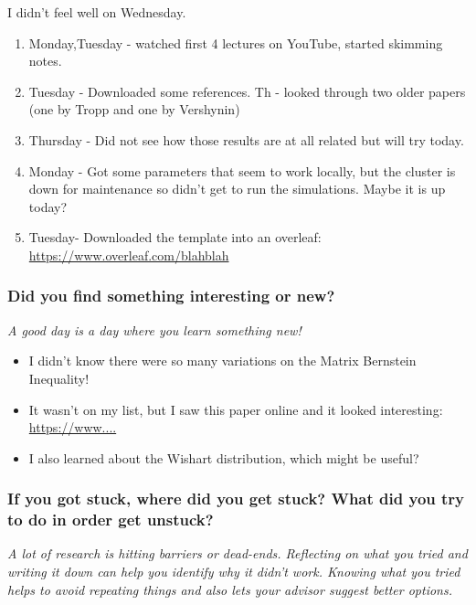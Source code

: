 \documentclass[10pt, letter]{article}
\begin{document}
\begin{note}
I didn't feel well on Wednesday.
	\begin{enumerate}
	\item Monday,Tuesday - watched first 4 lectures on YouTube, started skimming notes.
	\item Tuesday - Downloaded some references. Th - looked through two older papers (one by Tropp and one by Vershynin)
	\item Thursday - Did not see how those results are at all related but will try today.
	\item Monday - Got some parameters that seem to work locally, but the cluster is down for maintenance so didn't get to run the simulations. Maybe it is up today?
	\item Tuesday- Downloaded the template into an overleaf: \url{https://www.overleaf.com/blahblah}
	\end{enumerate}
\end{note}


\subsubsection*{Did you find something interesting or new?}  

\textit{A good day is a day where you learn something new!}

\begin{note}
	\begin{itemize}
	\item I didn't know there were so many variations on the Matrix Bernstein Inequality!
	\item It wasn't on my list, but I saw this paper online and it looked interesting: \url{https://www....}
	\item I also learned about the Wishart distribution, which might be useful?
	\end{itemize}
\end{note}


\subsubsection*{If you got stuck, where did you get stuck? What did you try to do in order get unstuck?}

\textit{A lot of research is hitting barriers or dead-ends. Reflecting on what you tried and writing it down can help you identify why it didn't work. Knowing what you tried helps to avoid repeating things and also lets your advisor suggest better options. }
\end{document}

